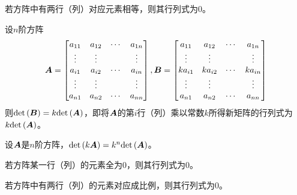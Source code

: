 \documentclass{ctexart}
\begin{document}
\begin{infer}
    若方阵中有两行（列）对应元素相等，则其行列式为\(0\)。
\end{infer}

\begin{property}
    设\(n\)阶方阵
    \begin{equation*}
        \boldsymbol{A}=\begin{bmatrix}
            a_{11} & a_{12} & \cdots & a_{1n} \\
            \vdots & \vdots &        & \vdots \\
            a_{i1} & a_{i2} & \cdots & a_{in} \\
            \vdots & \vdots &        & \vdots \\
            a_{n1} & a_{n2} & \cdots & a_{nn}
        \end{bmatrix},\boldsymbol{B}=\begin{bmatrix}
            a_{11}  & a_{12}  & \cdots & a_{1n}  \\
            \vdots  & \vdots  &        & \vdots  \\
            ka_{i1} & ka_{i2} & \cdots & ka_{in} \\
            \vdots  & \vdots  &        & \vdots  \\
            a_{n1}  & a_{n2}  & \cdots & a_{nn}
        \end{bmatrix}
    \end{equation*}
    则\(\mathrm{det}\left( \boldsymbol{B} \right)=k\mathrm{det}\left( \boldsymbol{A} \right)\)，即将\(\boldsymbol{A}\)的第\(i\)行（列）乘以常数\(k\)所得新矩阵的行列式为\(k\mathrm{det}\left( \boldsymbol{A} \right)\)。
\end{property}

\begin{infer}
    设\(\boldsymbol{A}\)是\(n\)阶方阵，\(\mathrm{det}\left( k\boldsymbol{A} \right)=k^n\mathrm{det}\left( \boldsymbol{A} \right)\)。
\end{infer}

\begin{infer}
    若方阵某一行（列）的元素全为\(0\)，则其行列式为\(0\)。
\end{infer}

\begin{infer}
    若方阵中有两行（列）的元素对应成比例，则其行列式为\(0\)。
\end{infer}
\end{document}
